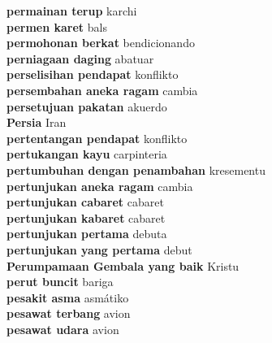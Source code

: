 \textbf{ permainan terup  } karchi \\
\textbf{ permen karet  } bals \\
\textbf{ permohonan berkat  } bendicionando \\
\textbf{ perniagaan daging  } abatuar \\
\textbf{ perselisihan pendapat  } konflikto \\
\textbf{ persembahan aneka ragam  } cambia \\
\textbf{ persetujuan pakatan  } akuerdo \\
\textbf{ Persia  } Iran \\
\textbf{ pertentangan pendapat  } konflikto \\
\textbf{ pertukangan kayu  } carpinteria \\
\textbf{ pertumbuhan dengan penambahan  } kresementu \\
\textbf{ pertunjukan aneka ragam  } cambia \\
\textbf{ pertunjukan cabaret  } cabaret \\
\textbf{ pertunjukan kabaret  } cabaret \\
\textbf{ pertunjukan pertama  } debuta \\
\textbf{ pertunjukan yang pertama  } debut \\
\textbf{ Perumpamaan Gembala yang baik  } Kristu \\
\textbf{ perut buncit  } bariga \\
\textbf{ pesakit asma  } asmátiko \\
\textbf{ pesawat terbang  } avion \\
\textbf{ pesawat udara  } avion \\
